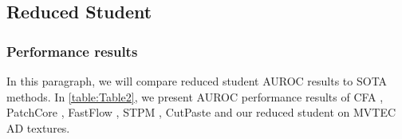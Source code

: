 \documentclass[a4paper,twoside]{article}
\begin{document}
\subsection{Reduced Student}
\subsubsection{Performance results}
In this paragraph, we will compare reduced student AUROC results to SOTA methods. In \ref{table:Table2}, we present AUROC performance results of CFA \citep{lee_cfa_2022}, PatchCore \citep{roth_towards_2021}, FastFlow \citep{yu_fastflow_2021}, STPM \citep{wang_student-teacher_2021}, CutPaste \citep{li_cutpaste_2021} and our reduced student on MVTEC AD textures.


\begin{table}[h]
	\centering
    \captionsetup{justification=centering}
	\caption{\textbf{Image-AUROC comparison on MVTEC AD : Reduced Student}}
	\footnotesize
	\setlength{\tabcolsep}{2pt}
	\renewcommand{\arraystretch}{1.3}
\end{table}
\end{document}
